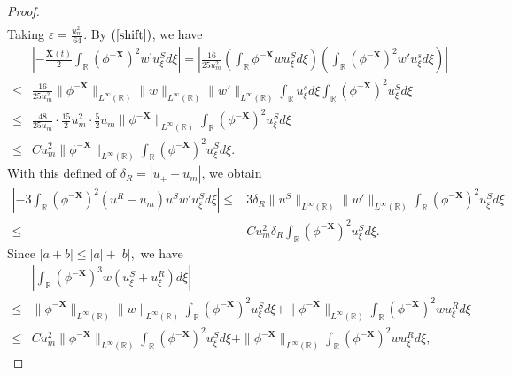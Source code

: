\documentclass[10pt,reqno]{amsart}
\numberwithin{equation}{section}
\begin{document}
\begin{proof}
\begin{equation}
\begin{aligned}
			\end{aligned}
		\end{equation}
		Taking $\varepsilon=\frac{u_m^2}{64}.$ By $(\ref{shift})$, we have
		\begin{equation}\label{N2}
			\begin{aligned}
				&\left|-\frac{\dot{\mathbf{X}}(t)}{2} \int_{\mathbb{R}}\left(\phi^{-\mathbf{X}}\right)^{2} w^{\prime} u_{\xi}^{S} d \xi\right|
				=\left| \frac{16}{25u_m^2} \left( \int_{\mathbb{R}} \phi^{-\mathbf{X}} wu_{\xi}^S d\xi \right) \left(\int_{\mathbb{R}}(\phi^{-\mathbf{X}})^2 w' u_{\xi}^s  d\xi \right) \right|\\
				\leq &\frac{16}{25u_m^2} \|\phi^{-\mathbf{X}}\|_{L^\infty(\mathbb{R})} \|w\|_{L^\infty(\mathbb{R})} \|w'\|_{L^\infty(\mathbb{R})} \int_{\mathbb{R}} u_{\xi}^s d\xi \int_{\mathbb{R}} (\phi^{-\mathbf{X}})^2 u_{\xi}^S d\xi\\
				\leq &\frac{48}{25u_m}  \cdot\frac{15}{2}u_m^2\cdot \frac{5}{2}u_m\|\phi^{-\mathbf{X}}\|_{L^\infty(\mathbb{R})} \int_{\mathbb{R}} (\phi^{-\mathbf{X}})^2 u_{\xi}^S d\xi\\
				\leq &C u_m^2 \|\phi^{-\mathbf{X}}\|_{L^{\infty}(\mathbb{R})} \int_{\mathbb{R}} (\phi^{-\mathbf{X}})^2 u_{\xi}^S d\xi.
			\end{aligned}
		\end{equation}
		With this defined of $\delta_R=|u_+-u_m|$, we obtain
		\begin{equation}\label{N3}
			\begin{aligned}
				\left|-3\int_{\mathbb{R}}(\phi^{-\mathbf{X}})^2(u^R-u_{m})u^Sw'u_{\xi}^Sd\xi\right|
				\leq&3\delta_R\|u^S\|_{L^{\infty}(\mathbb{R})}\|w'\|_{L^{\infty}(\mathbb{R})} \int_{\mathbb{R}}(\phi^{-\mathbf{X}})^2u_{\xi}^Sd\xi\\
				\leq&C u_m^2\delta_R\int_{\mathbb{R}}(\phi^{-\mathbf{X}})^2u_{\xi}^Sd\xi.
			\end{aligned}
		\end{equation} 
		Since $|a+b|\leq |a|+|b|,$ we have
		\begin{equation}\label{N4}
			\begin{aligned}
				&\left|\int_{\mathbb{R}}(\phi^{-\mathbf{X}})^3w(u_{\xi}^S+u_{\xi}^R)d\xi\right|\\
				\leq &\|\phi^{-\mathbf{X}}\|_{L^\infty(\mathbb{R})} \|w\|_{L^\infty(\mathbb{R})}\int_{\mathbb{R}} (\phi^{-\mathbf{X}})^2 u_{\xi}^S d\xi+\|\phi^{-\mathbf{X}}\|_{L^\infty(\mathbb{R})}\int_{\mathbb{R}} (\phi^{-\mathbf{X}})^2w u_{\xi}^Rd\xi\\
				\leq&C u_m^2\|\phi^{-\mathbf{X}}\|_{L^\infty(\mathbb{R})}\int_{\mathbb{R}} (\phi^{-\mathbf{X}})^2 u_{\xi}^S d\xi+\|\phi^{-\mathbf{X}}\|_{L^\infty(\mathbb{R})}\int_{\mathbb{R}} (\phi^{-\mathbf{X}})^2w u_{\xi}^Rd\xi,

\end{aligned}
\end{equation}
\end{proof}
\end{document}
